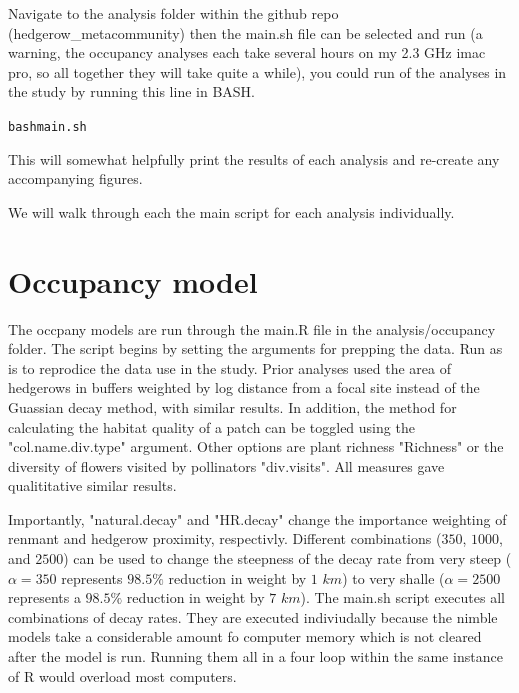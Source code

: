 \documentclass{article}\usepackage[]{graphicx}\usepackage[]{color}
\makeatletter
\newenvironment{kframe}{%
 \def\at@end@of@kframe{}%
 \ifinner\ifhmode%
  \def\at@end@of@kframe{\end{minipage}}%
  \begin{minipage}{\columnwidth}%
 \fi\fi%
 \def\FrameCommand##1{\hskip\@totalleftmargin \hskip-\fboxsep
 \colorbox{shadecolor}{##1}\hskip-\fboxsep
     \hskip-\linewidth \hskip-\@totalleftmargin \hskip\columnwidth}%
 \MakeFramed {\advance\hsize-\width
   \@totalleftmargin\z@ \linewidth\hsize
   \@setminipage}}%
 {\par\unskip\endMakeFramed%
 \at@end@of@kframe}
\newenvironment{knitrout}{}{} %
\makeatother
\begin{document}
Navigate to the analysis folder within the github repo
(hedgerow\_metacommunity) then the main.sh file can be selected and
run (a warning, the occupancy analyses each take several hours on my
2.3 GHz imac pro, so all together they will take quite a while), you
could run of the analyses in the study by running this line in BASH.

\begin{knitrout}
\color{fgcolor}\begin{kframe}
\begin{alltt}
bash main.sh
\end{alltt}
\end{kframe}
\end{knitrout}

This will somewhat helpfully print the results of each analysis
and re-create any accompanying figures.

We will walk through each the main script for each analysis
individually.

\section{Occupancy model}

The occpany models are run through the main.R file in the
analysis/occupancy folder. The script begins by setting the arguments
for prepping the data. Run as is to reprodice the data use in the
study. Prior analyses used the area of hedgerows in buffers weighted
by log distance from a focal site instead of the Guassian decay
method, with similar results. In addition, the method for calculating
the habitat quality of a patch can be toggled using the
"col.name.div.type" argument. Other options are plant richness
"Richness" or the diversity of flowers visited by pollinators
"div.visits". All measures gave qualititative similar results.

Importantly, "natural.decay" and "HR.decay" change the importance
weighting of renmant and hedgerow proximity, respectivly. Different
combinations ($350$, $1000$, and $2500$) can be used to change the
steepness of the decay rate from very steep ($\alpha=350$ represents
$98.5\%$ reduction in weight by $1$ $km$) to very shalle
($\alpha=2500$ represents a $98.5\%$ reduction in weight by $7$
$km$). The main.sh script executes all combinations of decay
rates. They are executed indiviudally because the nimble models take a
considerable amount fo computer memory which is not cleared after the
model is run. Running them all in a four loop within the same instance
of R would overload most computers.
\end{document}
